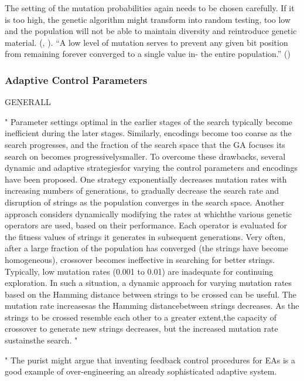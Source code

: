 The setting of the mutation probabilities again needs to be chosen carefully. If it is too high, the genetic algorithm might transform into random testing, too low and the population will not be able to maintain diversity and reintroduce genetic material. (\cite{klampfl_using_nodate}, \cite{grefenstette_optimization_1986}). 
\enquote{A low level of mutation serves to prevent any given bit position from remaining forever converged to a single value in- the entire population.} (\cite{grefenstette_optimization_1986})


\iffalse
\subsubsection{Adaptive Control Parameters}

GEŅERALL

"
Parameter settings optimal in the earlier stages of the search typically become inefficient during the later stages. Similarly, encodings become too coarse as the search progresses, and the fraction of the search space that the GA focuses its search on becomes progressivelysmaller. To overcome these drawbacks, several dynamic and adaptive strategiesfor varying the control parameters and encodings have been proposed. One strategy exponentially decreases mutation rates with increasing numbers of generations, to gradually decrease the search rate and disruption of strings as the population converges in the search space. Another approach considers dynamically modifying the rates at whichthe various genetic operators are used, based on their performance. Each operator is evaluated for the fitness values of strings it generates in subsequent generations. Very often, after a large fraction of the population has converged (the strings have become homogeneous), crossover becomes ineffective in searching for better strings. Typically, low mutation rates (0.001 to 0.01) are inadequate for continuing exploration. In such a situation, a dynamic approach for varying mutation rates based on the Hamming distance between strings to be crossed can be useful. The mutation rate increasesas the Hamming distancebetween strings decreases. As the strings to be crossed resemble each other to a greater extent,the capacity of crossover to generate new strings decreases, but the increased mutation rate sustainsthe search.
"\cite{srinivas_genetic_1994}

"
The purist might argue that inventing feedback control procedures for EAs is a good example of over-engineering an already sophisticated adaptive system.

